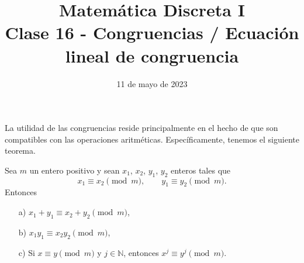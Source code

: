 \documentclass[handout]{beamer} %
\title[Clase 16 - Congruencia ]{Matemática Discreta I \\ Clase 16 - Congruencias / Ecuación lineal de congruencia}
\institute[]{\normalsize FAMAF / UNC
    \\[\baselineskip] ${}^{}$
    \\[\baselineskip]
}
\date[11/05/2023]{11 de mayo de 2023}
\begin{document}
    
    \frame{\titlepage} 
    
    
    \begin{frame}
        La utilidad de las congruencias reside principalmente en el hecho
        de que son compatibles con las operaciones aritméticas. \pause
        Específicamente, tenemos el siguiente teorema.
        
        \begin{teorema}\label{t4.1} Sea $m$ un entero positivo y sean $x_1$, $x_2$,
            $y_1$, $y_2$ enteros tales que
            $$
            x_1 \equiv x_2 \pmod{m}, \qquad y_1 \equiv y_2 \pmod{m}.
            $$
            Entonces
            \begin{enumerate}
                \item[a)] $ x_1+ y_1 \equiv x_2+ y_2 \pmod{m}$,
                \item[b)] $x_1 y_1 \equiv x_2 y_2 \pmod{m}$,
                \item[c)] Si $x \equiv y \pmod{m}$  y $j \in  \mathbb N$, entonces $x^j \equiv y^j \pmod{m}$.
            \end{enumerate}
        \end{teorema}
        
    \end{frame}
    
    
    
\end{document}
